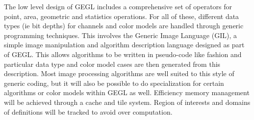 The low level design of GEGL includes a comprehensive set of operators for
point, area, geometric and statistics operations.  For all of these, different
data types (ie bit depths) for channels and color models are handled through
generic programming techniques. This involves the Generic Image Language (GIL),
a simple image manipulation and algorithm description language designed as part
of GEGL. This allows algorithms to be written in pseudo-code like fashion and
particular data type and color model cases are then generated from this
description. Most image processing algorithms are well suited to this style of
generic coding, but it will also be possible to do specialization for certain
algorithms or color models within GEGL as well. Efficiency memory management
will be achieved through a cache and tile system. Region of interests and
domains of definitions will be tracked to avoid over computation.
